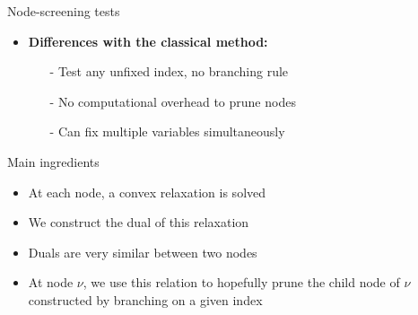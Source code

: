 \documentclass[final]{beamer}
\newlength{\onecolwid}
\newlength{\twocolwid}
\newcommand{\emphone}[1]{{\color{norange}#1}}
\begin{document}
\begin{frame}[t]
\begin{columns}[t]
\begin{column}{\twocolwid}
\begin{columns}[t,totalwidth=\twocolwid]
\begin{column}{\onecolwid}
\begin{block}{Node-screening tests}
\begin{center}
\begin{tikzpicture}
                    \end{tikzpicture}
                \end{center}
                \vspace*{0.5em}
                \begin{itemize}
                    \item \hspace*{0.1em} \textbf{Differences with the classical method:}
                    \begin{itemize}
                        \normalsize \item[-] \hspace*{0.1em} Test \emphone{any} unfixed index, no branching rule
                        \item[-] \hspace*{0.1em} No computational overhead to prune nodes
                        \item[-] \hspace*{0.1em} Can fix \emphone{multiple variables simultaneously}
                    \end{itemize}
                \end{itemize}
            \end{block}
            \begin{alertblock}{Main ingredients}
                \begin{itemize}
                    \item \hspace*{0.1em} At each node, a \emphone{convex relaxation} is solved
                    \item \hspace*{0.1em} We construct the \emphone{dual} of this relaxation
                    \item \hspace*{0.1em} Duals are very similar between two nodes
                    \item \hspace*{0.1em} At node $\nu$, we use this relation to hopefully \emphone{prune the child node} of $\nu$ constructed by branching on a given index
                \end{itemize}
            \end{alertblock}
        \end{column}
    \end{columns}

    \begin{figure}
        \begin{subfigure}[b]{0.49\textwidth}
            \centering
            
        \end{subfigure}
        \hfill
        \begin{subfigure}[b]{0.49\textwidth}
            \centering
            
        \end{subfigure}
    \end{figure}
\end{column}


\end{columns}
\end{frame}
\end{document}
